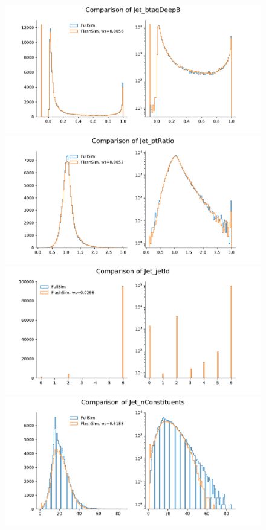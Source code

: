 \begin{figure}
    \myfloatalign
    \includegraphics[width=\linewidth]{gfx/ch5/eval3.pdf} \\
    \includegraphics[width=\linewidth]{gfx/ch5/eval12.pdf} \\
    \includegraphics[width=\linewidth]{gfx/ch5/eval16.pdf} \\
    \includegraphics[width=\linewidth]{gfx/ch5/eval10.pdf}

\end{figure}

